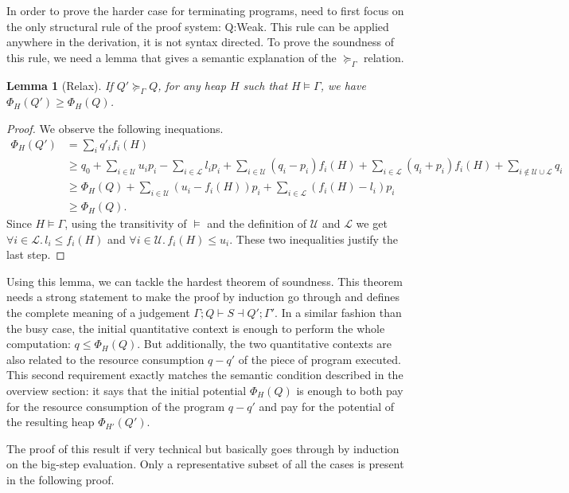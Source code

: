 \documentclass[nocopyrightspace,preprint]{sigplanconf}
\newtheorem{lemma}{Lemma}
\begin{document}
In order to prove the harder case for terminating programs, need to first
focus on the only structural rule of the proof system: {\sc Q:Weak}.  This
rule can be applied anywhere in the derivation, it is not syntax directed.
To prove the soundness of this rule, we need a lemma that gives a
semantic explanation of the $\succeq_\Gamma$ relation.

\begin{lemma}[Relax]
If $Q' \succeq_\Gamma Q$, for any heap $H$ such that $H \models \Gamma$,
we have $\Phi_H(Q') \ge \Phi_H(Q)$.
\end{lemma}
\begin{proof}
We observe the following inequations.
\begin{align*}
\Phi_H(Q') &= \sum_i q'_i f_i(H) \\
&\ge q_0 + \sum_{i\in\mathcal U} u_i p_i - \sum_{i\in\mathcal L} l_i p_i
  + \sum_{i\in\mathcal U} (q_i - p_i) f_i(H) + \sum_{i\in\mathcal L} (q_i + p_i) f_i(H)
  + \sum_{i\not\in \mathcal U \cup \mathcal L} q_i \\
 &\ge \Phi_H(Q)
  + \sum_{i\in\mathcal U} (u_i - f_i(H)) p_i
  + \sum_{i\in\mathcal L} (f_i(H) - l_i) p_i \\
 &\ge \Phi_H(Q).
\end{align*}
Since $H \models \Gamma$, using the transitivity of $\models$ and
the definition of $\mathcal U$ and $\mathcal L$ we get
$\forall i\in\mathcal L.\, l_i \le f_i(H)$ and
$\forall i\in\mathcal U.\, f_i(H)\le u_i$.
These two inequalities justify the last step.
\end{proof}

Using this lemma, we can tackle the hardest theorem of soundness.  This theorem
needs a strong statement to make the proof by induction go through and defines
the complete meaning of a judgement $\Gamma; Q \vdash S \dashv Q'; \Gamma'$.
In a similar fashion than the busy case, the initial quantitative context is enough
to perform the whole computation: $q \le \Phi_H(Q)$.  But additionally, the
two quantitative contexts are also related to the resource consumption $q - q'$
of the piece of program executed.  This second requirement exactly matches
the semantic condition described in the overview section: it says that the
initial potential $\Phi_H(Q)$ is enough to both pay for the resource
consumption of the program $q - q'$ and pay for the potential of the resulting
heap $\Phi_{H'}(Q')$.

The proof of this result if very technical but basically goes through by induction
on the big-step evaluation.  Only a representative subset of all the cases
is present in the following proof.
\end{document}
